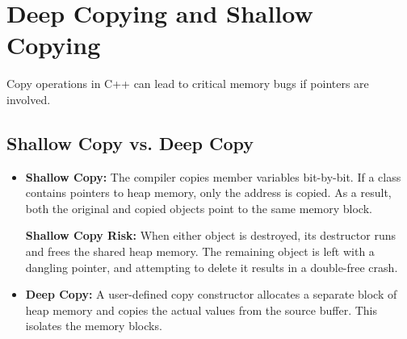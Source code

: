 \documentclass[12pt,a4paper]{article}
\begin{document}
\section{Deep Copying and Shallow Copying}

Copy operations in C++ can lead to critical memory bugs if pointers are involved.

\subsection{Shallow Copy vs. Deep Copy}
\begin{itemize}[leftmargin=*, itemsep=3pt]
  \item \textbf{Shallow Copy:} The compiler copies member variables bit-by-bit. If a class contains pointers to heap memory, only the address is copied. As a result, both the original and copied objects point to the same memory block.
    \begin{tcolorbox}[defbox]
    \textbf{Shallow Copy Risk:} When either object is destroyed, its destructor runs and frees the shared heap memory. The remaining object is left with a dangling pointer, and attempting to delete it results in a double-free crash.
    \end{tcolorbox}
  \item \textbf{Deep Copy:} A user-defined copy constructor allocates a separate block of heap memory and copies the actual values from the source buffer. This isolates the memory blocks.
\end{itemize}
\end{document}
